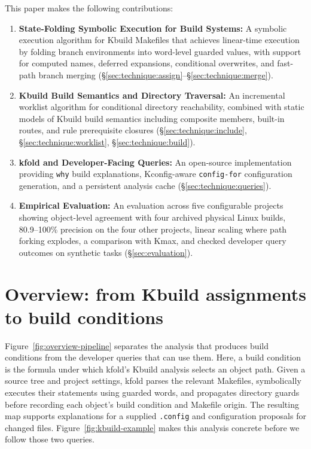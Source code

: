 \documentclass[acmsmall]{acmart}
\newcommand{\tool}{\textsf{kfold}\xspace}
\newcommand{\kmax}{\textsf{Kmax}\xspace}
\begin{document}
This paper makes the following contributions:
\begin{enumerate}
\item \textbf{State-Folding Symbolic Execution for Build Systems:} A symbolic execution algorithm for Kbuild Makefiles that achieves linear-time execution by folding branch environments into word-level guarded values, with support for computed names, deferred expansions, conditional overwrites, and fast-path branch merging (\S\ref{sec:technique:assign}--\S\ref{sec:technique:merge}).
\item \textbf{Kbuild Build Semantics and Directory Traversal:} An incremental worklist algorithm for conditional directory reachability, combined with static models of Kbuild build semantics including composite members, built-in routes, and rule prerequisite closures (\S\ref{sec:technique:include}, \S\ref{sec:technique:worklist}, \S\ref{sec:technique:build}).
\item \textbf{\tool and Developer-Facing Queries:} An open-source implementation providing \texttt{why} build explanations, Kconfig-aware \texttt{config-for} configuration generation, and a persistent analysis cache (\S\ref{sec:technique:queries}).
\item \textbf{Empirical Evaluation:} An evaluation across five configurable projects showing object-level agreement with four archived physical Linux builds, 80.9--100\% precision on the four other projects, linear scaling where path forking explodes, a comparison with \kmax, and checked developer query outcomes on synthetic tasks (\S\ref{sec:evaluation}).
\end{enumerate}

\section{Overview: from Kbuild assignments to build conditions}\label{overview-from-kbuild-assignments-to-build-conditions}

Figure~\ref{fig:overview-pipeline} separates the analysis that produces build conditions from the developer queries that can use them.
Here, a build condition is the formula under which \tool's Kbuild analysis selects an object path.
Given a source tree and project settings, \tool parses the relevant Makefiles, symbolically executes their statements using guarded words, and propagates directory guards before recording each object's build condition and Makefile origin.
The resulting map supports explanations for a supplied \texttt{.config} and configuration proposals for changed files.
Figure~\ref{fig:kbuild-example} makes this analysis concrete before we follow those two queries.
\end{document}

